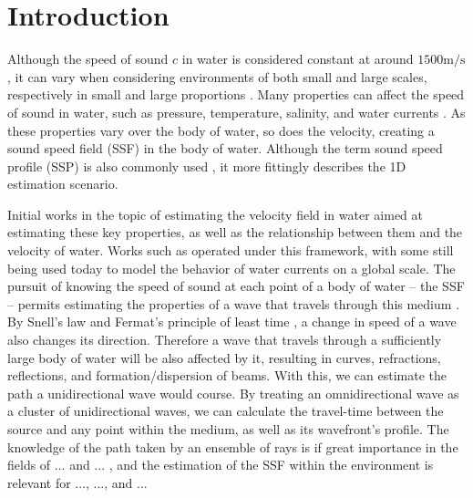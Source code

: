 \section{Introduction}

Although the speed of sound $c$ in water is considered constant at around $1500 \si{\meter}/\si{\second}$, it can vary when considering environments of both small and large scales, respectively in small and large proportions \cite{kieffer_sound_1977,trusler_determination_2017,li_sound_2015,pinson_sound_2010}. Many properties can affect the speed of sound in water, such as pressure, temperature, salinity, and water currents \cite{wilson_speed_1959,medwin_fundamentals_1998,mcdougall_getting_2011,delgrosso_new_1974}. As these properties vary over the body of water, so does the velocity, creating a sound speed field (SSF) in the body of water. Although the term sound speed profile (SSP) is also commonly used \cite{li_acoustic_2019,li_sound_2015,pinson_sound_2010}, it more fittingly describes the 1D estimation scenario.

Initial works in the topic of estimating the velocity field in water aimed at estimating these key properties, as well as the relationship between them and the velocity of water. Works such as \cite{wilson_speed_1959,medwin_fundamentals_1998,mcdougall_getting_2011,delgrosso_new_1974,chen_speed_1977,wong_speed_1995,roquet_accurate_2015} operated under this framework, with some still being used today to model the behavior of water currents on a global scale.
The pursuit of knowing the speed of sound at each point of a body of water -- the SSF -- permits estimating the properties of a wave that travels through this medium  \cite{?}. By Snell's law \cite{snells-law} and Fermat's principle of least time \cite{fermats-least-time}, a change in speed of a wave also changes its direction. Therefore a wave that travels through a sufficiently large body of water will be also affected by it, resulting in curves, refractions, reflections, and formation/dispersion of beams. With this, we can estimate the path a unidirectional wave would course. By treating an omnidirectional wave as a cluster of unidirectional waves, we can calculate the travel-time between the source and any point within the medium, as well as its wavefront's profile. The knowledge of the path taken by an ensemble of rays is if great importance in the fields of ... and ... \cite{?,?}, and the estimation of the SSF within the environment is relevant for ..., ..., and ... \cite{?,?,?}

